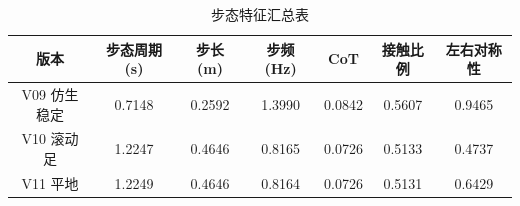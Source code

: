 \begin{table}[htbp]
\centering
\begin{tabular}{c|c|c|c|c|c|c}
\hline
版本 & 步态周期 (s) & 步长 (m) & 步频 (Hz) & CoT & 接触比例 & 左右对称性 \\
\hline
V09 仿生稳定 & 0.7148 & 0.2592 & 1.3990 & 0.0842 & 0.5607 & 0.9465 \\
V10 滚动足 & 1.2247 & 0.4646 & 0.8165 & 0.0726 & 0.5133 & 0.4737 \\
V11 平地 & 1.2249 & 0.4646 & 0.8164 & 0.0726 & 0.5131 & 0.6429 \\
\hline
\end{tabular}
\caption{步态特征汇总表}
\end{table}

